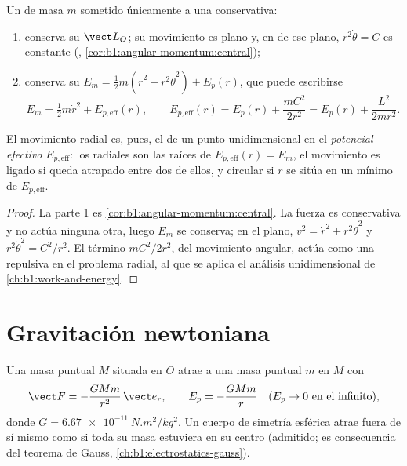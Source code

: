 \begin{theorem}\label{thm:b1:central-forces:reduction}
Un  de masa $m$ sometido únicamente a una  conservativa:
\begin{enumerate}
  \item conserva su  $\vect L_O$; su movimiento es plano
        y, en  de ese plano, $r^2\dot\theta = C$ es
        constante (, \cref{cor:b1:angular-momentum:central});
  \item conserva su  $E_m = \tfrac12 m(\dot r^2 + r^2\dot\theta^2)
        + E_p(r)$, que puede escribirse
        \[
        E_m = \tfrac12 m\dot r^2 + E_{p,\mathrm{eff}}(r), \qquad
        E_{p,\mathrm{eff}}(r) = E_p(r) + \frac{mC^2}{2r^2} = E_p(r) + \frac{L^2}{2mr^2} .
        \]
\end{enumerate}
El movimiento radial es, pues, el de un punto unidimensional en el
\emph{potencial efectivo} $E_{p,\mathrm{eff}}$: los 
radiales son las raíces de $E_{p,\mathrm{eff}}(r) = E_m$, el movimiento es
ligado si queda atrapado entre dos de ellos, y circular si $r$ se sitúa en
un mínimo de $E_{p,\mathrm{eff}}$.
\end{theorem}

\begin{proof}
La parte 1 es \cref{cor:b1:angular-momentum:central}. La fuerza es
conservativa y no actúa ninguna otra, luego $E_m$ se conserva; en el
plano, $v^2 = \dot r^2 + r^2\dot\theta^2$ y $r^2\dot\theta^2 = C^2/r^2$.
El término $mC^2/2r^2$,  del movimiento angular, actúa
como una \emph{} repulsiva en el problema radial, al que
se aplica el análisis unidimensional de \cref{ch:b1:work-and-energy}.
\end{proof}

\section{Gravitación newtoniana}

\begin{definition}\label{def:b1:central-forces:gravitation}
Una masa puntual $M$ situada en $O$ atrae a una masa puntual $m$ en $M$ con
\[
\vect F = -\frac{GMm}{r^2}\,\vect e_r, \qquad E_p = -\frac{GMm}{r} \quad (E_p \to 0 \text{ en el infinito}),
\]
donde $G = \qty{6.67e-11}{N.m^2/kg^2}$. Un cuerpo de simetría esférica
atrae fuera de sí mismo como si toda su masa estuviera en su centro
(admitido; es consecuencia del teorema de Gauss,
\cref{ch:b1:electrostatics-gauss}).
\end{definition}

